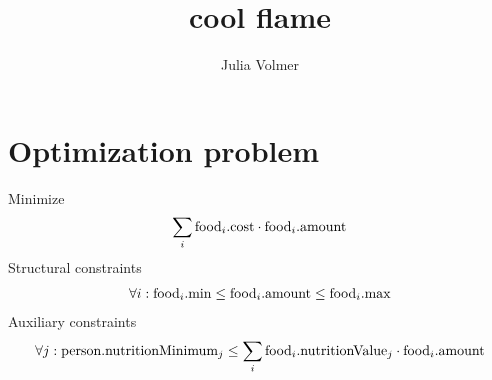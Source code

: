 \documentclass[a4paper,11pt,bibtotoc,fleqn]{scrartcl}
\begin{document}
\title{cool flame}
\author{Julia Volmer}
\date{\empty}
\maketitle

\tableofcontents

\section{Optimization problem}
Minimize
\begin{align}
  \sum_i \text{food}_i.\text{cost} \cdot \text{food}_i.\text{amount}
\end{align}
Structural constraints
\begin{align}
  \forall i: \text{food}_i.\text{min} \le \text{food}_i.\text{amount} \le \text{food}_i.\text{max}
\end{align}
Auxiliary constraints
\begin{align}
  \forall j: \text{person}.\text{nutritionMinimum}_j \le \sum_i
  \text{food}_i.\text{nutritionValue}_j \cdot \text{food}_i.\text{amount}
\end{align}
\end{document}
